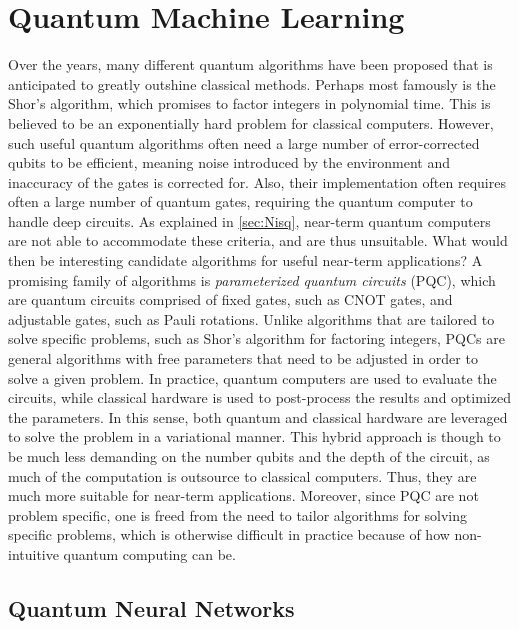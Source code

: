 \chapter{Quantum Machine Learning}\label{chap:QML}
Over the years, many different quantum algorithms have been proposed that is anticipated to greatly outshine classical methods. Perhaps most famously is the Shor's algorithm\cite{Shor_1997}, which promises to factor integers in polynomial time. This is believed to be an exponentially hard problem for classical computers. However, such useful quantum algorithms often need a large number of error-corrected qubits to be efficient, meaning noise introduced by the environment and inaccuracy of the gates is corrected for. Also, their implementation often requires often a large number of quantum gates, requiring the quantum computer to handle deep circuits. As explained in \cref{sec:Nisq}, near-term quantum computers are not able to accommodate these criteria, and are thus unsuitable. What would then be interesting candidate algorithms for useful near-term applications? A promising family of algorithms is \emph{parameterized quantum circuits} (PQC), which are quantum circuits comprised of fixed gates, such as CNOT gates, and adjustable gates, such as Pauli rotations\cite{Benedetti_2019}. Unlike algorithms that are tailored to solve specific problems, such as Shor's algorithm for factoring integers, PQCs are general algorithms with free parameters that need to be adjusted in order to solve a given problem. In practice, quantum computers are used to evaluate the circuits, while classical hardware is used to post-process the results and optimized the parameters. In this sense, both quantum and classical hardware are leveraged to solve the problem in a variational manner. This hybrid approach is though to be much less demanding on the number qubits and the depth of the circuit, as much of the computation is outsource to classical computers\cite{Cerezo_2021}. Thus, they are much more suitable for near-term applications. Moreover, since PQC are not problem specific, one is freed from the need to tailor algorithms for solving specific problems, which is otherwise difficult in practice because of how non-intuitive quantum computing can be. 

\section{Quantum Neural Networks}\label{sec:QNN}

